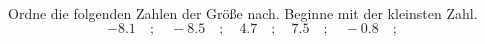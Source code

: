 \begin{aufgabe} ~ \\ 
Ordne die folgenden Zahlen der Gr\"o\ss{}e nach. Beginne mit der kleinsten Zahl.\[-8.1\quad ; \quad-8.5\quad ; \quad4.7\quad ; \quad7.5\quad ; \quad-0.8\quad ; \quad\]\end{aufgabe} 
